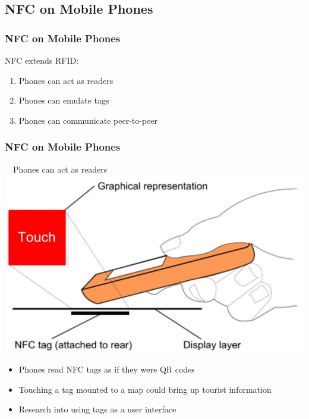 \documentclass[unknownkeysallowed]{beamer}
\begin{document}
\subsection{NFC on Mobile Phones}

\begin{frame}
\frametitle{NFC on Mobile Phones}
  \begin{center}
  \begin{minipage}{.7\textwidth}
  \begin{block}{NFC extends RFID:}
		\begin{enumerate}
		  \item{Phones can act as readers}
		  \item{Phones can emulate tags}
      \item{Phones can communicate peer-to-peer}
   	\end{enumerate}
  \end{block}
  \end{minipage}
  \end{center}
\end{frame}

\begin{frame}
\frametitle{NFC on Mobile Phones}
  \begin{center}
  \begin{minipage}{.7\textwidth}
  \begin{block}{~~Phones can act as readers}\centering
      \includegraphics[width=\linewidth,height=0.4\textheight,keepaspectratio]{figures/hardy.jpg}
      \begin{itemize}
  		  \item{Phones read NFC tags as if they were QR codes}
        \pause
  		  \item{Touching a tag mounted to a map could bring up tourist information}
        \pause
        \item{Research into using tags as a user interface}
     	\end{itemize}
  \end{block}
  \end{minipage}
  \end{center}
\end{frame}
\end{document}
